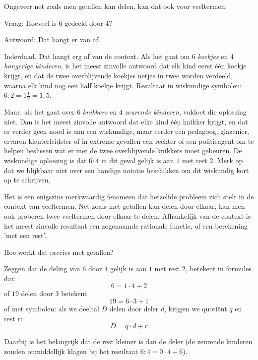 \documentclass{ximera}
\begin{document}
    \author{Zomercursus KU Leuven}
    

\begin{xmuitweiding} Ongeveer net zoals men getallen kan delen, kan dat ook voor veeltermen: 



Vraag: Hoeveel is $6$ gedeeld door $4$? 

Antwoord: Dat hangt er van af. 

Inderdaad. Dat hangt erg af van de context. Als het gaat om $6$ \textit{koekjes} en $4$ \textit{hongerige kinderen}, is het meest zinvolle antwoord dat elk kind eerst één koekje krijgt, en dat de twee overblijvende koekjes netjes in twee worden verdeeld, waarna elk kind nog een half koekje krijgt. Resultaat in wiskundige symbolen: $6:2=1\frac{1}{2} = 1,5$.

Maar, als het gaat over $6$ \textit{knikkers} en $4$ \textit{zeurende kinderen}, voldoet die oplossing niet. Dan is het meest zinvolle antwoord dat elke kind één knikker krijgt, en dat er verder geen nood is aan een wiskundige, maar eerder een pedagoog, glazenier, ervaren kleuterleidster of in extreme gevallen een rechter of een politieagent om te helpen beslissen wat er met de twee overblijvende knikkers moet gebeuren. De wiskundige oplossing is dat $6:4$ in dit geval gelijk is aan $1$ met rest $2$. Merk op dat we blijkbaar niet over een  handige notatie beschikken om dit wiskundig kort op te schrijven.


Het is een enigszins merkwaardig fenomeen dat hetzelfde probleem zich stelt in de context van veeltermen. Net zoals met getallen kan delen door elkaar, kan men ook proberen twee veeltermen door elkaar te delen. Afhankelijk van de context is het meest zinvolle resultaat een zogenaamde rationale functie, of een berekening 'met een rest'.

Hoe werkt dat precies met getallen? 

Zeggen dat de deling van $6$ door $4$ gelijk is aan $1$ met rest $2$, betekent in formules dat:
$$
6 = 1 \cdot 4  + 2
$$
of $19$ delen door $3$ betekent
$$
19 = 6\cdot 3 + 1
$$
of met symbolen: als we deeltal $D$ delen door deler $d$, krijgen we quotiënt $q$ en rest $r$:
$$
D = q\cdot d + r
$$

Daarbij is het belangrijk dat de rest kleiner is dan de deler (de zeurende kinderen zouden onmiddellijk klagen bij het resultaat $6:4=0\cdot4+6$).

\end{xmuitweiding}
\end{document}
